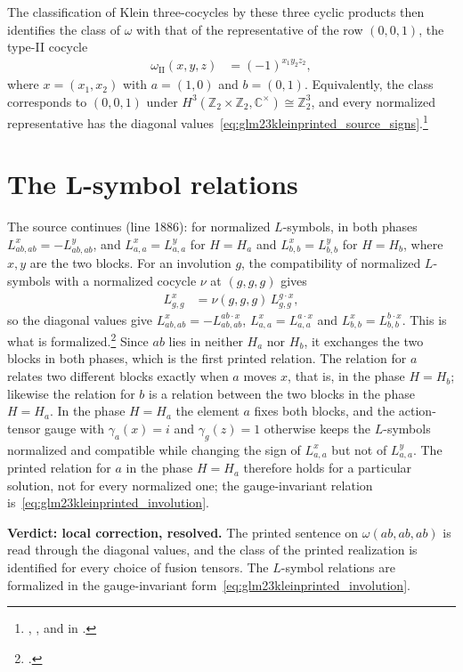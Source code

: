 \documentclass{article}
\begin{document}
The classification of Klein three-cocycles by these three cyclic products then
identifies the class of $\omega$ with that of the representative of the row
$(0,0,1)$, the type-II cocycle
\begin{align}
    \omega_{\mathrm{II}}(x,y,z) & =(-1)^{x_1y_2z_2},
    \label{eq:glm23kleinprinted_type_two}
\end{align}
where $x=(x_1,x_2)$ with $a=(1,0)$ and $b=(0,1)$. Equivalently, the class
corresponds to $(0,0,1)$ under $H^3(\mathbb{Z}_2\times\mathbb{Z}_2,
\mathbb{C}^\times)\cong\mathbb{Z}_2^3$, and every normalized representative
has the diagonal values~\eqref{eq:glm23kleinprinted_source_signs}.\footnote{
    ,
    , and
     in
    .}

\section{The L-symbol relations}

The source continues (line 1886): for normalized $L$-symbols, in both phases
$L^x_{ab,ab}=-L^y_{ab,ab}$, and $L^x_{a,a}=L^y_{a,a}$ for $H=H_a$ and
$L^x_{b,b}=L^y_{b,b}$ for $H=H_b$, where $x,y$ are the two blocks. For an
involution $g$, the compatibility of normalized $L$-symbols with a normalized
cocycle $\nu$ at $(g,g,g)$ gives
\begin{align}
    L^x_{g,g} & =\nu(g,g,g)\,L^{g\cdot x}_{g,g},
    \label{eq:glm23kleinprinted_involution}
\end{align}
so the diagonal values give $L^x_{ab,ab}=-L^{ab\cdot x}_{ab,ab}$,
$L^x_{a,a}=L^{a\cdot x}_{a,a}$ and $L^x_{b,b}=L^{b\cdot x}_{b,b}$. This is
what is formalized.\footnote{
    .}
Since $ab$ lies in neither $H_a$ nor $H_b$, it exchanges the two blocks in both
phases, which is the first printed relation. The relation for $a$ relates two
different blocks exactly when $a$ moves $x$, that is, in the phase $H=H_b$;
likewise the relation for $b$ is a relation between the two blocks in the phase
$H=H_a$. In the phase $H=H_a$ the element $a$ fixes both blocks, and the
action-tensor gauge with $\gamma_a(x)=i$ and $\gamma_g(z)=1$ otherwise keeps
the $L$-symbols normalized and compatible while changing the sign of
$L^x_{a,a}$ but not of $L^y_{a,a}$. The printed relation for $a$ in the phase
$H=H_a$ therefore holds for a particular solution, not for every normalized
one; the gauge-invariant relation is~\eqref{eq:glm23kleinprinted_involution}.

\textbf{Verdict: local correction, resolved.} The printed sentence on
$\omega(ab,ab,ab)$ is read through the diagonal values, and the class of the
printed realization is identified for every choice of fusion tensors. The
$L$-symbol relations are formalized in the gauge-invariant
form~\eqref{eq:glm23kleinprinted_involution}.



\end{document}
